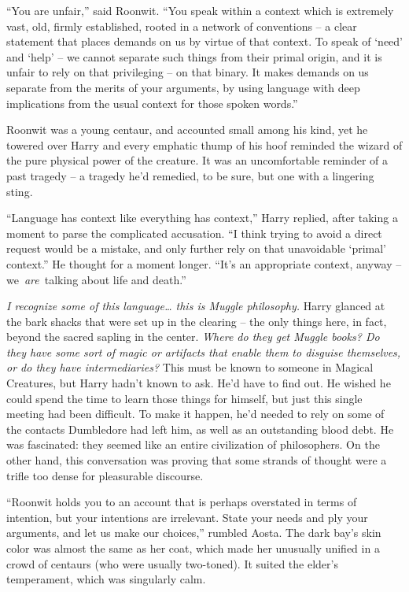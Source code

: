 ``You are unfair,'' said Roonwit. ``You speak within a context which is
extremely vast, old, firmly established, rooted in a network of
conventions -- a clear statement that places demands on us by virtue of
that context. To speak of `need' and `help' -- we cannot separate such
things from their primal origin, and it is unfair to rely on that
privileging -- on that binary. It makes demands on us separate from the
merits of your arguments, by using language with deep implications from
the usual context for those spoken words.''

Roonwit was a young centaur, and accounted small among his kind, yet he
towered over Harry and every emphatic thump of his hoof reminded the
wizard of the pure physical power of the creature. It was an
uncomfortable reminder of a past tragedy -- a tragedy he'd remedied, to
be sure, but one with a lingering sting.

``Language has context like everything has context,'' Harry replied,
after taking a moment to parse the complicated accusation. ``I think
trying to avoid a direct request would be a mistake, and only further
rely on that unavoidable `primal' context.'' He thought for a moment
longer. ``It's an appropriate context, anyway -- we~\emph{are}~talking
about life and death.''

\emph{I recognize some of this language\ldots{} this is Muggle
philosophy.} Harry glanced at the bark shacks that were set up in the
clearing -- the only things here, in fact, beyond the sacred sapling in
the center. \emph{Where do they get Muggle books? Do they have some sort
of magic or artifacts that enable them to disguise themselves, or do
they have intermediaries?} This must be known to someone in Magical
Creatures, but Harry hadn't known to ask. He'd have to find out. He
wished he could spend the time to learn those things for himself, but
just this single meeting had been difficult. To make it happen, he'd
needed to rely on some of the contacts Dumbledore had left him, as well
as an outstanding blood debt. He was fascinated: they seemed like an
entire civilization of philosophers. On the other hand, this
conversation was proving that some strands of thought were a trifle too
dense for pleasurable discourse.

``Roonwit holds you to an account that is perhaps overstated in terms of
intention, but your intentions are irrelevant. State your needs and ply
your arguments, and let us make our choices,'' rumbled Aosta. The dark
bay's skin color was almost the same as her coat, which made her
unusually unified in a crowd of centaurs (who were usually two-toned).
It suited the elder's temperament, which was singularly calm.

